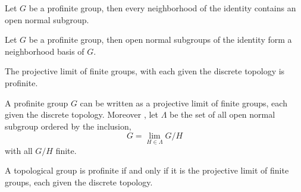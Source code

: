 \begin{lemma}
	\label{theorem-profinite-open-normal-subgroup-subset-nhds}
	\leanok
	Let $ G $ be a profinite group, then every neighborhood of the identity contains an open normal subgroup.
\end{lemma}

\begin{lemma}
	Let $ G $ be a profinite group, then open normal subgroups of the identity form a neighborhood basis of $ G $.
\end{lemma}

\begin{theorem}
	\label{theorem-profinite-limit-finite-group-profinite}
	\leanok
	The projective limit of finite groups, with each given the discrete topology is profinite.
\end{theorem}

\begin{theorem}
	\label{theorem-profinite-profinite-group-eq-limit-finite-group}
	\leanok
	A profinite group $G$ can be written as a projective limit of finite groups, each given the discrete topology. Moreover , let $\Lambda$ be the set of all open normal subgroup ordered by the inclusion, 
	$$
	G = \lim_{H \in \Lambda} G/H 
	$$
	with all $G/H$ finite.
	
\end{theorem}

\begin{theorem}
	A topological group is profinite if and only if it is the projective limit of finite groups, each given the discrete topology.
\end{theorem}
